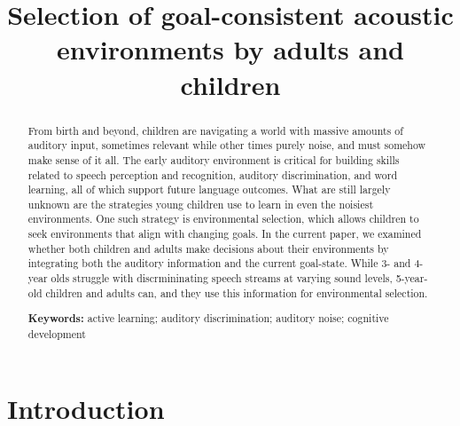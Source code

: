 \documentclass[10pt, letterpaper]{article}
\title{Selection of goal-consistent acoustic environments by adults and
children}
\begin{document}
\maketitle

\begin{abstract}
From birth and beyond, children are navigating a world with massive
amounts of auditory input, sometimes relevant while other times purely
noise, and must somehow make sense of it all. The early auditory
environment is critical for building skills related to speech perception
and recognition, auditory discrimination, and word learning, all of
which support future language outcomes. What are still largely unknown
are the strategies young children use to learn in even the noisiest
environments. One such strategy is environmental selection, which allows
children to seek environments that align with changing goals. In the
current paper, we examined whether both children and adults make
decisions about their environments by integrating both the auditory
information and the current goal-state. While 3- and 4-year olds
struggle with discrmininating speech streams at varying sound levels,
5-year-old children and adults can, and they use this information for
environmental selection.

\textbf{Keywords:}
active learning; auditory discrimination; auditory noise; cognitive
development
\end{abstract}

\hypertarget{introduction}{%
\section{\texorpdfstring{\textbf{Introduction}}{Introduction}}\label{introduction}}
\end{document}
